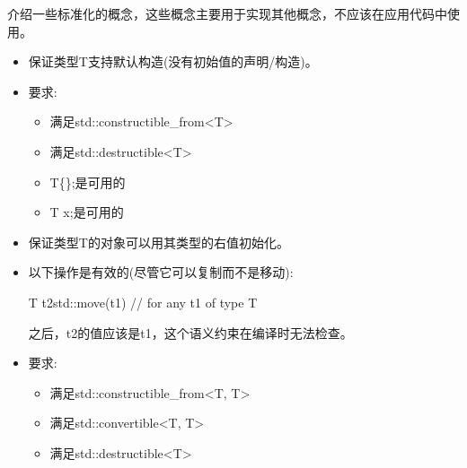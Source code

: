 

介绍一些标准化的概念，这些概念主要用于实现其他概念，不应该在应用代码中使用。



\begin{itemize}
\item
保证类型T支持默认构造(没有初始值的声明/构造)。

\item
要求:
\begin{itemize}
\item
满足std::constructible\_from<T>

\item
满足std::destructible<T>
\item
T\{\};是可用的

\item
T x;是可用的
\end{itemize}
\end{itemize}


\begin{itemize}
\item
保证类型T的对象可以用其类型的右值初始化。

\item
以下操作是有效的(尽管它可以复制而不是移动):

\begin{cpp}
T t2{std::move(t1)} // for any t1 of type T
\end{cpp}

之后，t2的值应该是t1，这个语义约束在编译时无法检查。

\item
要求:
\begin{itemize}
\item
满足std::constructible\_from<T, T>

\item
满足std::convertible<T, T>

\item
满足std::destructible<T>
\end{itemize}
\end{itemize}


